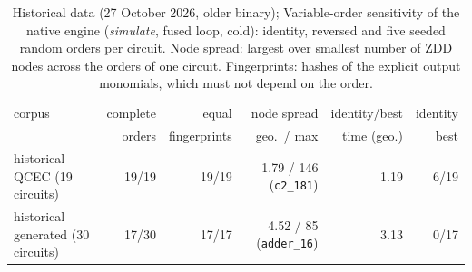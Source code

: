 \begin{table}[t]
\centering\footnotesize
\caption{Historical data (27 October 2026, older binary); Variable-order sensitivity of the native engine (\emph{simulate}, fused loop, cold): identity, reversed and five seeded random orders per circuit. Node spread: largest over smallest number of ZDD nodes across the orders of one circuit. Fingerprints: hashes of the explicit output monomials, which must not depend on the order.}
\label{tab:order}
\begin{tabular}{lrrrrr}
\toprule
corpus & complete & equal & node spread & identity/best & identity \\
 & orders & fingerprints & geo.\ / max & time (geo.) & best \\
\midrule
historical QCEC (19 circuits) & 19/19 & 19/19 & 1.79 / 146 (\texttt{c2\_181}) & 1.19 & 6/19 \\
historical generated (30 circuits) & 17/30 & 17/17 & 4.52 / 85 (\texttt{adder\_16}) & 3.13 & 0/17 \\
\bottomrule
\end{tabular}
\end{table}
